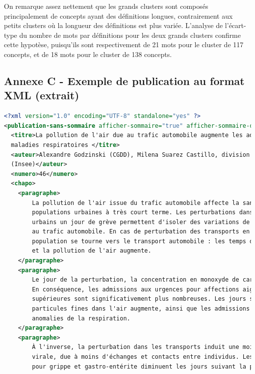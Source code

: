 On remarque assez nettement que les grands clusters sont composés principalement de concepts ayant des définitions longues, contrairement aux petits clusters où la longueur des définitions est plus variée. L'analyse de l'écart-type du nombre de mots par définitions pour les deux grands clusters confirme cette hypotèse, puisqu'ils sont respectivement de 21 mots pour le cluster de 117 concepts, et de 18 mots pour le cluster de 138 concepts.

\label{hierarchisation}
\newpage

\subsection*{Annexe C - Exemple de publication au format XML (extrait)}
\begin{lstlisting}[language=XML, basicstyle=\small]
<?xml version="1.0" encoding="UTF-8" standalone="yes" ?> 
<publication-sans-sommaire afficher-sommaire="true" afficher-sommaire-documentation="false">
  <titre>La pollution de l'air due au trafic automobile augmente les admissions aux urgences pour 
  maladies respiratoires </titre> 
  <auteur>Alexandre Godzinski (CGDD), Milena Suarez Castillo, division Marchés et entreprises 
  (Insee)</auteur> 
  <numero>46</numero> 
  <chapo>
    <paragraphe>
        La pollution de l'air issue du trafic automobile affecte la santé respiratoire des 
        populations urbaines à très court terme. Les perturbations dans les transports en commun 
        urbains un jour de grève permettent d'isoler des variations de pollution de l'air attribuables
        au trafic automobile. En cas de perturbation des transports en commun, une partie de la 
        population se tourne vers le transport automobile : les temps de parcours sont alors plus longs, 
        et la pollution de l'air augmente.
    </paragraphe> 
    <paragraphe>
        Le jour de la perturbation, la concentration en monoxyde de carbone est plus élevée.
        En conséquence, les admissions aux urgences pour affections aigues des voies respiratoires 
        supérieures sont significativement plus nombreuses. Les jours suivants, la concentration en 
        particules fines dans l'air augmente, ainsi que les admissions aux urgences pour 
        anomalies de la respiration.
    </paragraphe> 
    <paragraphe>
        À l'inverse, la perturbation dans les transports induit une moindre propagation
        virale, due à moins d'échanges et contacts entre individus. Les admissions aux urgences 
        pour grippe et gastro-entérite diminuent les jours suivant la perturbation. Ainsi, les 

\end{lstlisting}
